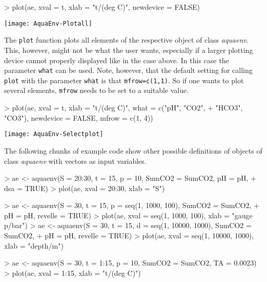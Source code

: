 \documentclass[article,nojss]{jss}
\begin{document}
\begin{Schunk}
\begin{Sinput}
> plot(ae, xval = t, xlab = "t/(deg C)", newdevice = FALSE)
\end{Sinput}
\end{Schunk}
\texttt{[image: AquaEnv-Plotall]}
\vspace*{-2cm}

The \texttt{plot} function plots all elements of the respective object of class \textit{aquaenv}. This, however, might not be what the user wants,
especially if a larger plotting device cannot properly displayed like in the case above. In this case the parameter \texttt{what} can be used.
Note, however, that the default setting for calling \texttt{plot} with the parameter \texttt{what} is that \texttt{mfrow=c(1,1)}. So
if one wants to plot several elements, \texttt{mfrow} needs to be set to a suitable value.

\begin{Schunk}
\begin{Sinput}
> plot(ae, xval = t, xlab = "t/(deg C)", what = c("pH", "CO2", 
+     "HCO3", "CO3"), newdevice = FALSE, mfrow = c(1, 4))
\end{Sinput}
\end{Schunk}
\texttt{[image: AquaEnv-Selectplot]}


The following chunks  of example code show other possible definitions of objects of class \textit{aquaenv} with vectors as input variables. 
\begin{Schunk}
\begin{Sinput}
> ae <- aquaenv(S = 20:30, t = 15, p = 10, SumCO2 = SumCO2, pH = pH, 
+     dsa = TRUE)
> plot(ae, xval = 20:30, xlab = "S")
\end{Sinput}
\end{Schunk}

\begin{Schunk}
\begin{Sinput}
> ae <- aquaenv(S = 30, t = 15, p = seq(1, 1000, 100), SumCO2 = SumCO2, 
+     pH = pH, revelle = TRUE)
> plot(ae, xval = seq(1, 1000, 100), xlab = "gauge p/bar")
> ae <- aquaenv(S = 30, t = 15, d = seq(1, 10000, 1000), SumCO2 = SumCO2, 
+     pH = pH, revelle = TRUE)
> plot(ae, xval = seq(1, 10000, 1000), xlab = "depth/m")
\end{Sinput}
\end{Schunk}

\begin{Schunk}
\begin{Sinput}
> ae <- aquaenv(S = 30, t = 1:15, p = 10, SumCO2 = SumCO2, TA = 0.0023)
> plot(ae, xval = 1:15, xlab = "t/(deg C)")
\end{Sinput}
\end{Schunk}
\end{document}
